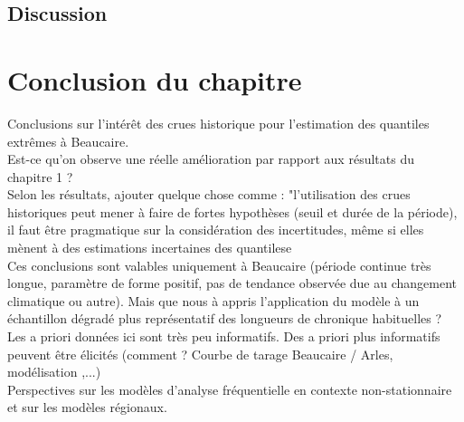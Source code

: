 \documentclass[11pt]{article}
\begin{document}
	\subsection{Discussion}
	
\section{Conclusion du chapitre}
	Conclusions sur l'intérêt des crues historique pour l'estimation des quantiles extrêmes à Beaucaire. \\
	Est-ce qu'on observe une réelle amélioration par rapport aux résultats du chapitre 1 ?\\
	Selon les résultats, ajouter quelque chose comme : "l'utilisation des crues historiques peut mener à faire de fortes hypothèses (seuil et durée de la période), il faut être pragmatique sur la considération des incertitudes, même si elles mènent à des estimations incertaines des quantilese\\
	Ces conclusions sont valables uniquement à Beaucaire (période continue très longue, paramètre de forme positif, pas de tendance observée due au changement climatique ou autre). Mais que nous à appris l'application du modèle à un échantillon dégradé plus représentatif des longueurs de chronique habituelles ?\\
	Les a priori données ici sont très peu informatifs. Des a priori plus informatifs peuvent être élicités (comment ? Courbe de tarage Beaucaire / Arles, modélisation ,...) \\
	Perspectives sur les modèles d'analyse fréquentielle en contexte non-stationnaire et sur les modèles régionaux.  

\printbibliography
\end{document}
